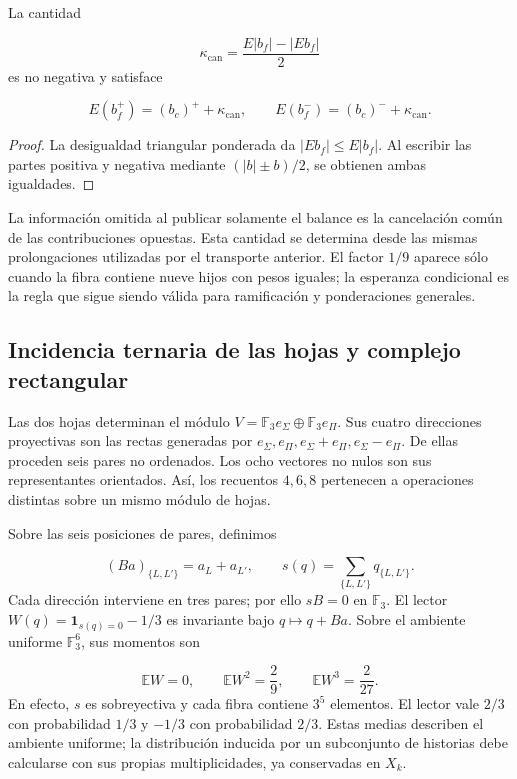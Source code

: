 \begin{proposition}
\label{x_reciprocidad:iv:cont:cancelacion}
La cantidad

\[
\kappa_{\mathrm{can}}=
\frac{E|b_f|-|Eb_f|}{2}
\]
es no negativa y satisface

\[
E(b_f^+)=(b_c)^++\kappa_{\mathrm{can}},
\qquad
E(b_f^-)=(b_c)^-+\kappa_{\mathrm{can}}.
\]
\end{proposition}
\begin{proof}
La desigualdad triangular ponderada da \(|Eb_f|\leq E|b_f|\). Al escribir las partes positiva y negativa mediante \((|b|\pm b)/2\), se obtienen ambas igualdades.
\end{proof}

La información omitida al publicar solamente el balance es la cancelación común de las contribuciones opuestas. Esta cantidad se determina desde las mismas prolongaciones utilizadas por el transporte anterior. El factor \(1/9\) aparece sólo cuando la fibra contiene nueve hijos con pesos iguales; la esperanza condicional es la regla que sigue siendo válida para ramificación y ponderaciones generales.

\subsection{Incidencia ternaria de las hojas y complejo rectangular}
\label{x_reciprocidad:iv:cont:incidencia-rectangular}
Las dos hojas determinan el módulo \(V=\mathbb F_3e_\Sigma\oplus\mathbb F_3e_\Pi\). Sus cuatro direcciones proyectivas son las rectas generadas por \(e_\Sigma,e_\Pi,e_\Sigma+e_\Pi,e_\Sigma-e_\Pi\). De ellas proceden seis pares no ordenados. Los ocho vectores no nulos son sus representantes orientados. Así, los recuentos \(4,6,8\) pertenecen a operaciones distintas sobre un mismo módulo de hojas.

Sobre las seis posiciones de pares, definimos

\[
(Ba)_{\{L,L'\}}=a_L+a_{L'},
\qquad
s(q)=\sum_{\{L,L'\}}q_{\{L,L'\}}.
\]
Cada dirección interviene en tres pares; por ello \(sB=0\) en \(\mathbb F_3\). El lector \(W(q)=\mathbf1_{s(q)=0}-1/3\) es invariante bajo \(q\mapsto q+Ba\). Sobre el ambiente uniforme \(\mathbb F_3^6\), sus momentos son

\[
\mathbb EW=0,\qquad
\mathbb EW^2=\frac29,\qquad
\mathbb EW^3=\frac2{27}.
\]
En efecto, \(s\) es sobreyectiva y cada fibra contiene \(3^5\) elementos. El lector vale \(2/3\) con probabilidad \(1/3\) y \(-1/3\) con probabilidad \(2/3\). Estas medias describen el ambiente uniforme; la distribución inducida por un subconjunto de historias debe calcularse con sus propias multiplicidades, ya conservadas en \(X_k\).

